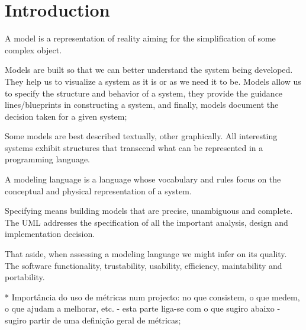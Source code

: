 \section{Introduction}

\indent
\par A model is a representation of reality aiming for the simplification of some complex object.

\par Models are built so that we can better understand the system being developed.
They help us to visualize a system as it is or as we need it to be. Models allow us to specify the structure and behavior of a system, they provide the guidance lines/blueprints in constructing a system, and finally, models document the decision taken for a given system;


\par Some models are best described textually, other graphically. All interesting systems exhibit structures that transcend what can be represented in a programming language.


\par A modeling language is a language whose vocabulary and rules focus on the conceptual and physical representation of a system.%

\par Specifying means building models that are precise, unambiguous and complete. The UML addresses the specification of all the important analysis, design and implementation decision. %


\par That aside, when assessing a modeling language we might infer on its quality. The software functionality, trustability, usability, efficiency, maintability and portability.



    * Importância do uso de métricas num projecto: no que consistem, o que medem, o que ajudam a melhorar, etc. - esta parte liga-se com o que sugiro abaixo - sugiro partir de uma definição geral de métricas;\\

